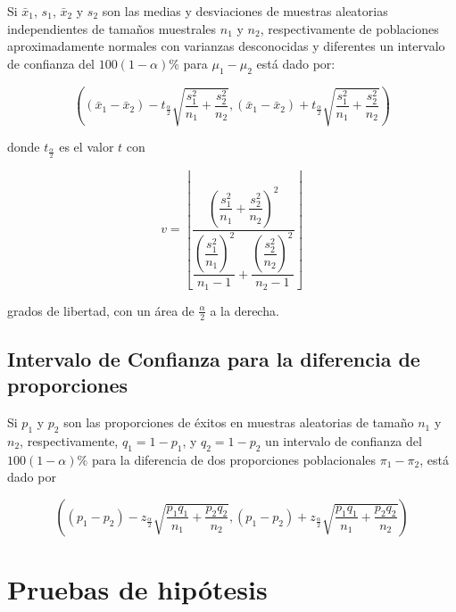 \documentclass[]{book}
\begin{document}
Si \(\bar{x}_1\), \(s_1\), \(\bar{x}_2\) y \(s_2\) son las medias y
desviaciones de muestras aleatorias independientes de tamaños muestrales
\(n_1\) y \(n_2\), respectivamente de poblaciones aproximadamente
normales con varianzas desconocidas y diferentes un intervalo de
confianza del \(100\left(1-\alpha \right)\%\) para \(\mu_1 - \mu_2\)
está dado por:

\begin{equation} 
\left( \left( \bar{x}_1 - \bar{x}_2 \right) - t_{\frac{\alpha}{2}}\sqrt{\dfrac{s_1^2}{n_1} + \dfrac{s_2^2}{n_2}} , \left( \bar{x}_1 - \bar{x}_2 \right) + t_{\frac{\alpha}{2}}\sqrt{\dfrac{s_1^2}{n_1} + \dfrac{s_2^2}{n_2}} \right) 
\label{eq:ic2msdd}
\end{equation}

donde \(t_{\frac{\alpha}{2}}\) es el valor \(t\) con

\begin{equation} 
v = \left\lfloor\dfrac{\left(\dfrac{s_1^2}{n_1} + \dfrac{s_2^2}{n_2} \right)^2}{\dfrac{\left( \dfrac{s_1^2}{n_1} \right)^2}{n_1-1}+\dfrac{\left( \dfrac{s_2^2}{n_2} \right)^2}{n_2-1}}\right\rfloor
\label{eq:dfsdd}
\end{equation}

grados de libertad, con un área de \(\frac{\alpha}{2}\) a la derecha.

\subsection{Intervalo de Confianza para la diferencia de
proporciones}\label{intervalo-de-confianza-para-la-diferencia-de-proporciones}

Si \(p_1\) y \(p_2\) son las proporciones de éxitos en muestras
aleatorias de tamaño \(n_1\) y \(n_2\), respectivamente,
\(q_1 = 1- p_1\), y \(q_2 = 1- p_2\) un intervalo de confianza del
\(100\left(1- \alpha \right)\%\) para la diferencia de dos proporciones
poblacionales \(\pi_1-\pi_2\), está dado por

\begin{equation} 
\left( \left( p_1 - p_2 \right) - z_{\frac{\alpha}{2}}\sqrt{\dfrac{p_1q_1}{n_1} + \dfrac{p_2q_2}{n_2}} , \left( p_1 - p_2 \right) + z_{\frac{\alpha}{2}}\sqrt{\dfrac{p_1q_1}{n_1} + \dfrac{p_2q_2}{n_2}}  \right)
\label{eq:icprop2}
\end{equation}

\section{Pruebas de hipótesis}\label{ph}
\end{document}
